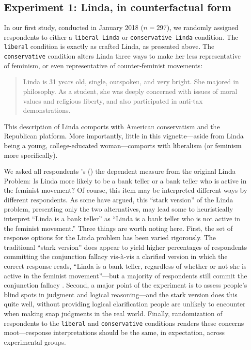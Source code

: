 \documentclass[12pt, letterpaper]{article}
\def\citeapos#1{\citeauthor{#1}'s (\citeyear{#1})}
\begin{document}
\subsection{Experiment 1: Linda, in counterfactual form}

In our first study, conducted in January 2018 ($n=297$), we randomly assigned respondents to either a {\tt liberal Linda} or {\tt conservative Linda} condition. The {\tt liberal} condition is exactly as \citet{tversky1983extension} crafted Linda, as presented above. The {\tt conservative} condition alters Linda three ways to make her less representative of feminism, or even representative of counter-feminist movements:
\begin{quotation}
\noindent Linda is 31 years old, single, outspoken, and very bright. She majored in philosophy. As a student, she was deeply concerned with issues of moral values and religious liberty, and also participated in anti-tax demonstrations.
\end{quotation}
\noindent This description of Linda comports with American conservatism and the Republican platform. More importantly, little in this vignette---aside from Linda being a young, college-educated woman---comports with liberalism (or feminism more specifically). 

We asked all respondents \citeapos{tversky1983extension} the dependent measure from the original Linda Problem: Is Linda more likely to be a bank teller or a bank teller who is active in the feminist movement? Of course, this item may be interpreted different ways by different respondents. As some have argued, this ``stark version'' of the Linda problem, presenting only the two alternatives, may lead some to heuristically interpret ``Linda is a bank teller'' as ``Linda is a bank teller who is not active in the feminist movement.'' Three things are worth noting here. First, the set of response options for the Linda problem has been varied rigorously. The traditional ``stark version'' does appear to yield higher percentages of respondents committing the conjunction fallacy vis-\`{a}-vis a clarified version in which the correct response reads, ``Linda is a bank teller, regardless of whether or not she is active in the feminist movement''---but a majority of respondents still commit the conjunction fallacy \citep{messer1993another}. Second, a major point of the experiment is to assess people's blind spots in judgment and logical reasoning---and the stark version does this quite well, without providing logical clarification people are unlikely to encounter when making snap judgments in the real world. Finally, randomization of respondents to the {\tt liberal} and {\tt conservative} conditions renders these concerns moot---response interpretations should be the same, in expectation, across experimental groups. 
\end{document}
